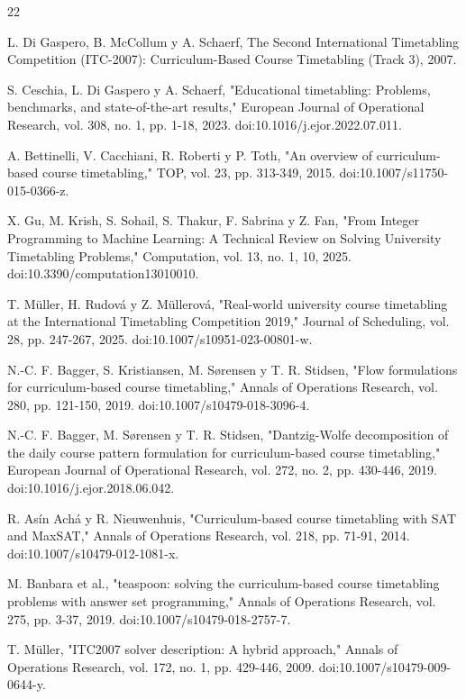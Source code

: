 \documentclass[journal]{IEEEtran}
\begin{document}
\begin{thebibliography}{22}

 L. Di Gaspero, B. McCollum y A. Schaerf, The Second International Timetabling Competition (ITC-2007): Curriculum-Based Course Timetabling (Track 3), 2007.

 S. Ceschia, L. Di Gaspero y A. Schaerf, "Educational timetabling: Problems, benchmarks, and state-of-the-art results," European Journal of Operational Research, vol. 308, no. 1, pp. 1-18, 2023. doi:10.1016/j.ejor.2022.07.011.

 A. Bettinelli, V. Cacchiani, R. Roberti y P. Toth, "An overview of curriculum-based course timetabling," TOP, vol. 23, pp. 313-349, 2015. doi:10.1007/s11750-015-0366-z.

 X. Gu, M. Krish, S. Sohail, S. Thakur, F. Sabrina y Z. Fan, "From Integer Programming to Machine Learning: A Technical Review on Solving University Timetabling Problems," Computation, vol. 13, no. 1, 10, 2025. doi:10.3390/computation13010010.

 T. Müller, H. Rudová y Z. Müllerová, "Real-world university course timetabling at the International Timetabling Competition 2019," Journal of Scheduling, vol. 28, pp. 247-267, 2025. doi:10.1007/s10951-023-00801-w.

 N.-C. F. Bagger, S. Kristiansen, M. Sørensen y T. R. Stidsen, "Flow formulations for curriculum-based course timetabling," Annals of Operations Research, vol. 280, pp. 121-150, 2019. doi:10.1007/s10479-018-3096-4.

 N.-C. F. Bagger, M. Sørensen y T. R. Stidsen, "Dantzig-Wolfe decomposition of the daily course pattern formulation for curriculum-based course timetabling," European Journal of Operational Research, vol. 272, no. 2, pp. 430-446, 2019. doi:10.1016/j.ejor.2018.06.042.

 R. Asín Achá y R. Nieuwenhuis, "Curriculum-based course timetabling with SAT and MaxSAT," Annals of Operations Research, vol. 218, pp. 71-91, 2014. doi:10.1007/s10479-012-1081-x.

 M. Banbara et al., "teaspoon: solving the curriculum-based course timetabling problems with answer set programming," Annals of Operations Research, vol. 275, pp. 3-37, 2019. doi:10.1007/s10479-018-2757-7.

 T. Müller, "ITC2007 solver description: A hybrid approach," Annals of Operations Research, vol. 172, no. 1, pp. 429-446, 2009. doi:10.1007/s10479-009-0644-y.


\end{thebibliography}
\end{document}
